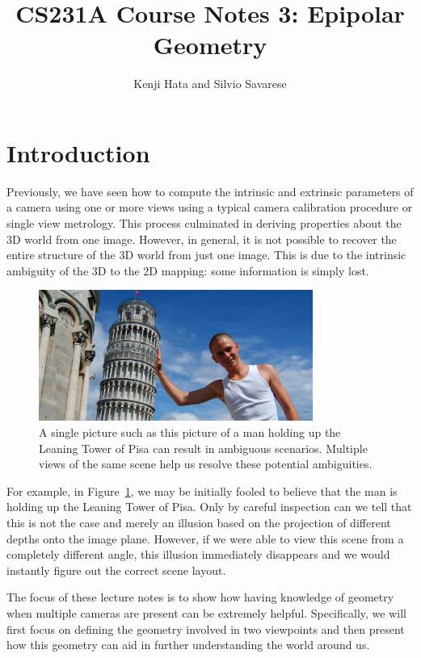 \documentclass[a4paper, 12pt]{article}
\title{CS231A Course Notes 3: Epipolar Geometry}
\author{Kenji Hata and Silvio Savarese}
\date{}
\begin{document}
\maketitle

\section{Introduction}
Previously, we have seen how to compute the intrinsic and extrinsic parameters of a camera using one or more views using a typical camera calibration procedure or single view metrology. This process culminated in deriving properties about the 3D world from one image. However, in general, it is not possible to recover the entire structure of the 3D world from just one image. This is due to the intrinsic ambiguity of the 3D to the 2D mapping: some information is simply lost.

\begin{figure}[h!]
\centering
\includegraphics[width=0.8\textwidth]{figures/pisa.jpg}
\caption{A single picture such as this picture of a man holding up the Leaning Tower of Pisa can result in ambiguous scenarios. Multiple views of the same scene help us resolve these potential ambiguities.}
\label{fig:pisa}
\end{figure}

For example, in Figure~\ref{fig:pisa}, we may be initially fooled to believe that the man is holding up the Leaning Tower of Pisa. Only by careful inspection can we tell that this is not the case and merely an illusion based on the projection of different depths onto the image plane. However, if we were able to view this scene from a completely different angle, this illusion immediately disappears and we would instantly figure out the correct scene layout. 

The focus of these lecture notes is to show how having knowledge of geometry when multiple cameras are present can be extremely helpful. Specifically, we will first focus on defining the geometry involved in two viewpoints and then present how this geometry can aid in further understanding the world around us. 
\end{document}
